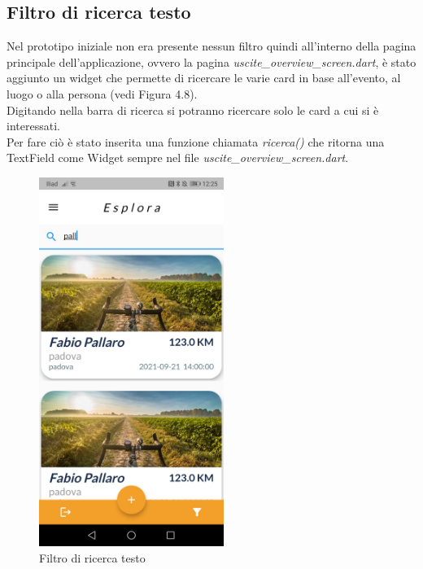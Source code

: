 \newpage

\subsection{Filtro di ricerca testo}
Nel prototipo iniziale non era presente nessun filtro quindi all'interno della pagina principale dell'applicazione, ovvero la pagina \textit{uscite\_overview\_screen.dart}, è stato aggiunto un widget che permette di ricercare le varie card in base all'evento, al luogo o alla persona (vedi Figura 4.8).\\
Digitando nella barra di ricerca si potranno ricercare solo le card a cui si è interessati.\\
Per fare ciò è stato inserita una funzione chiamata \textit{ricerca()} che ritorna una TextField come Widget sempre nel file \textit{uscite\_overview\_screen.dart}.\\

\begin{figure}[htbp]	
	\centering
	\includegraphics[width=6cm]{immagini/filtrotesto.jpeg}
	\caption{Filtro di ricerca testo}
	\label{fig:Filtro di ricerca testo}
\end{figure}

\newpage

